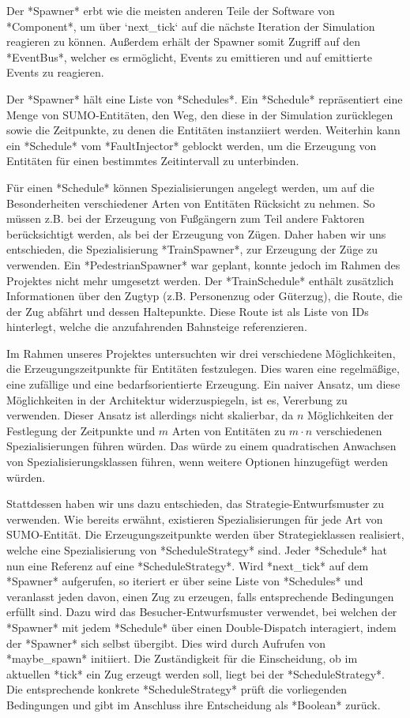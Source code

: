 Der *Spawner* erbt wie die meisten anderen Teile der Software von *Component*, um über `next\_tick` auf die nächste Iteration der Simulation reagieren zu können. Außerdem erhält der Spawner somit Zugriff auf den *EventBus*, welcher es ermöglicht, Events zu emittieren und auf emittierte Events zu reagieren.

Der *Spawner* hält eine Liste von *Schedules*. Ein *Schedule* repräsentiert eine Menge von SUMO-Entitäten, den Weg, den diese in der Simulation zurücklegen sowie die Zeitpunkte, zu denen die Entitäten instanziiert werden. Weiterhin kann ein *Schedule* vom *FaultInjector* geblockt werden, um die Erzeugung von Entitäten für einen bestimmtes Zeitintervall zu unterbinden.

Für einen *Schedule* können Spezialisierungen angelegt werden, um auf die Besonderheiten verschiedener Arten von Entitäten Rücksicht zu nehmen. So müssen z.B. bei der Erzeugung von Fußgängern zum Teil andere Faktoren berücksichtigt werden, als bei der Erzeugung von Zügen. Daher haben wir uns entschieden, die Spezialisierung *TrainSpawner*, zur Erzeugung der Züge zu verwenden. Ein *PedestrianSpawner* war geplant, konnte jedoch im Rahmen des Projektes nicht mehr umgesetzt werden. Der *TrainSchedule* enthält zusätzlich Informationen über den Zugtyp (z.B. Personenzug oder Güterzug), die Route, die der Zug abfährt und dessen Haltepunkte. Diese Route ist als Liste von IDs hinterlegt, welche die anzufahrenden Bahnsteige referenzieren.

Im Rahmen unseres Projektes untersuchten wir drei verschiedene Möglichkeiten, die Erzeugungszeitpunkte für Entitäten festzulegen. Dies waren eine regelmäßige, eine zufällige und eine bedarfsorientierte Erzeugung. Ein naiver Ansatz, um diese Möglichkeiten in der Architektur widerzuspiegeln, ist es, Vererbung zu verwenden. Dieser Ansatz ist allerdings nicht skalierbar, da $n$ Möglichkeiten der Festlegung der Zeitpunkte und $m$ Arten von Entitäten zu $m\cdot n$ verschiedenen Spezialisierungen führen würden. Das würde zu einem quadratischen Anwachsen von Spezialisierungsklassen führen, wenn weitere Optionen hinzugefügt werden würden.

Stattdessen haben wir uns dazu entschieden, das Strategie-Entwurfsmuster zu verwenden. Wie bereits erwähnt, existieren Spezialisierungen für jede Art von SUMO-Entität. Die Erzeugungszeitpunkte werden über Strategieklassen realisiert, welche eine Spezialisierung von *ScheduleStrategy* sind. Jeder *Schedule* hat nun eine Referenz auf eine *ScheduleStrategy*. Wird *next\_tick* auf dem *Spawner* aufgerufen, so iteriert er über seine Liste von *Schedules* und veranlasst jeden davon, einen Zug zu erzeugen, falls entsprechende Bedingungen erfüllt sind. Dazu wird das Besucher-Entwurfsmuster verwendet, bei welchen der *Spawner* mit jedem *Schedule* über einen Double-Dispatch interagiert, indem der *Spawner* sich selbst übergibt. Dies wird durch Aufrufen von *maybe\_spawn* initiiert. Die Zuständigkeit für die Einscheidung, ob im aktuellen *tick* ein Zug erzeugt werden soll, liegt bei der *ScheduleStrategy*. Die entsprechende konkrete *ScheduleStrategy* prüft die vorliegenden Bedingungen und gibt im Anschluss ihre Entscheidung als *Boolean* zurück.

